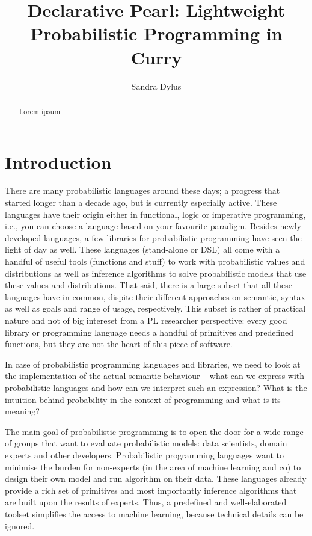\documentclass[
12pt, %
a4paper, %
oneside, %
]{llncs}
\title{Declarative Pearl: Lightweight Probabilistic Programming in Curry}
\author{Sandra Dylus}
\institute{Institut f\"ur Informatik, Christian-Albrechts-Universi\"at zu Kiel\\\email{sad@informatik.uni-kiel.de}}
\begin{document}
\maketitle

\begin{abstract}
  Lorem ipsum
\end{abstract}

\section{Introduction}
There are many probabilistic languages around these days; a progress
that started longer than a decade ago, but is currently especially
active. %
These languages have their origin either in functional, logic or
imperative programming, i.e., you can choose a language based on your
favourite paradigm. %
Besides newly developed languages, a few libraries for probabilistic
programming have seen the light of day as well. %
These languages (stand-alone or DSL) all come with a handful of
useful tools (functions and stuff) to work with probabilistic values
and distributions as well as inference algorithms to solve
probabilistic models that use these values and distributions. %
That said, there is a large subset that all these languages have in
common, dispite their different approaches on semantic, syntax as well
as goals and range of usage, respectively. %
This subset is rather of practical nature and not of big intereset
from a PL researcher perspective: every good library or programming
language needs a handful of primitives and predefined functions, but
they are not the heart of this piece of software. %

In case of probabilistic programming languages and libraries, we need
to look at the implementation of the actual semantic behaviour -- what
can we express with probabilistic languages and how can we interpret
such an expression? %
What is the intuition behind probability in the context of programming
and what is its meaning? %

The main goal of probabilistic programming is to open the door for a
wide range of groups that want to evaluate probabilistic models: data
scientists, domain experts and other developers. %
Probabilistic programming languages want to minimise the burden for
non-experts (in the area of machine learning and co) to design their
own model and run algorithm on their data. %
These languages already provide a rich set of primitives and most
importantly inference algorithms that are built upon the results of
experts. %
Thus, a predefined and well-elaborated toolset simplifies the access
to machine learning, because technical details can be ignored. %
\end{document}
